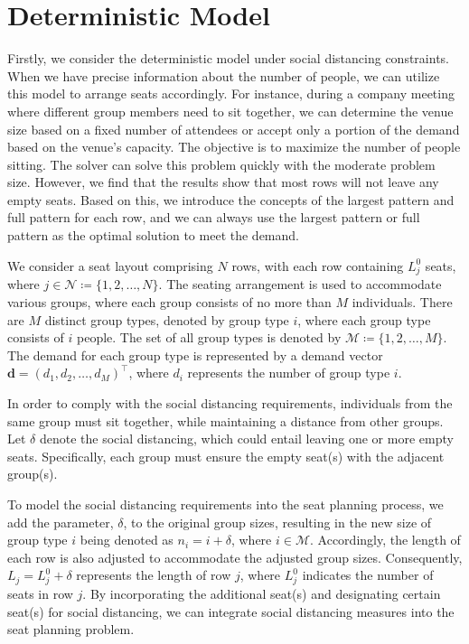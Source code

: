 \section{Deterministic Model}

Firstly, we consider the deterministic model under social distancing constraints. When we have precise information about the number of people, we can utilize this model to arrange seats accordingly. For instance, during a company meeting where different group members need to sit together, we can determine the venue size based on a fixed number of attendees or accept only a portion of the demand based on the venue's capacity. The objective is to maximize the number of people sitting. The solver can solve this problem quickly with the moderate problem size. However, we find that the results show that most rows will not leave any empty seats. Based on this, we introduce the concepts of the largest pattern and full pattern for each row, and we can always use the largest pattern or full pattern as the optimal solution to meet the demand.


We consider a seat layout comprising $N$ rows, with each row containing $L_j^0$ seats, where $j \in \mathcal{N} \coloneqq \{1,2, \ldots, N\}$. The seating arrangement is used to accommodate various groups, where each group consists of no more than $M$ individuals. There are $M$ distinct group types, denoted by group type $i$, where each group type consists of $i$ people. The set of all group types is denoted by $\mathcal{M} \coloneqq \{1, 2, \ldots, M\}$. The demand for each group type is represented by a demand vector $\mathbf{d} = (d_1, d_2, \ldots, d_M)^{\intercal}$, where $d_i$ represents the number of group type $i$.

In order to comply with the social distancing requirements, individuals from the same group must sit together, while maintaining a distance from other groups. Let $\delta$ denote the social distancing, which could entail leaving one or more empty seats. Specifically, each group must ensure the empty seat(s) with the adjacent group(s).


To model the social distancing requirements into the seat planning process, we add the parameter, $\delta$, to the original group sizes, resulting in the new size of group type $i$ being denoted as $n_i = i + \delta$, where $i \in \mathcal{M}$. Accordingly, the length of each row is also adjusted to accommodate the adjusted group sizes. Consequently, $L_j = L_j^{0} + \delta$ represents the length of row $j$, where $L_j^{0}$ indicates the number of seats in row $j$. By incorporating the additional seat(s) and designating certain seat(s) for social distancing, we can integrate social distancing measures into the seat planning problem.


